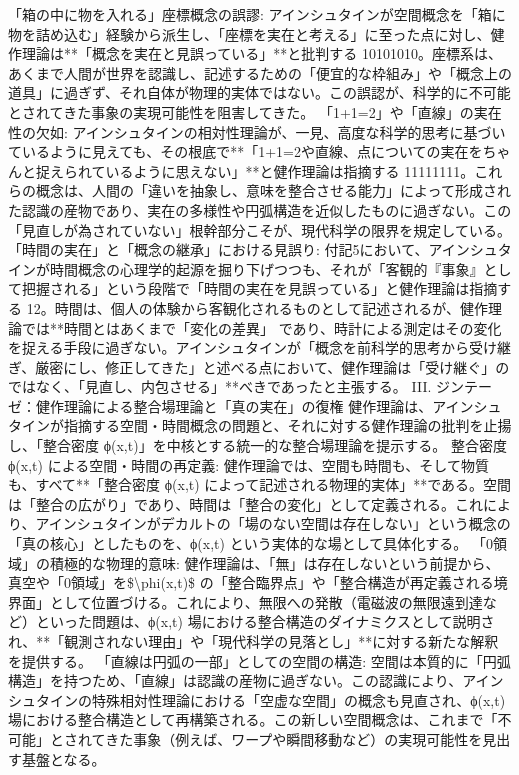 \documentclass{article}
\begin{document}
「箱の中に物を入れる」座標概念の誤謬:
アインシュタインが空間概念を「箱に物を詰め込む」経験から派生し、「座標を実在と考える」に至った点に対し、健作理論は**「概念を実在と見誤っている」**と批判する 10101010。座標系は、あくまで人間が世界を認識し、記述するための「便宜的な枠組み」や「概念上の道具」に過ぎず、それ自体が物理的実体ではない。この誤認が、科学的に不可能とされてきた事象の実現可能性を阻害してきた。
「1+1=2」や「直線」の実在性の欠如:
アインシュタインの相対性理論が、一見、高度な科学的思考に基づいているように見えても、その根底で**「1+1=2や直線、点についての実在をちゃんと捉えられているように思えない」**と健作理論は指摘する 11111111。これらの概念は、人間の「違いを抽象し、意味を整合させる能力」によって形成された認識の産物であり、実在の多様性や円弧構造を近似したものに過ぎない。この「見直しが為されていない」根幹部分こそが、現代科学の限界を規定している。
「時間の実在」と「概念の継承」における見誤り:
付記5において、アインシュタインが時間概念の心理学的起源を掘り下げつつも、それが「客観的『事象』として把握される」という段階で「時間の実在を見誤っている」と健作理論は指摘する 12。時間は、個人の体験から客観化されるものとして記述されるが、健作理論では**時間とはあくまで「変化の差異」
であり、時計による測定はその変化を捉える手段に過ぎない。アインシュタインが「概念を前科学的思考から受け継ぎ、厳密にし、修正してきた」と述べる点において、健作理論は「受け継ぐ」のではなく、「見直し、内包させる」**べきであったと主張する。
III. ジンテーゼ：健作理論による整合場理論と「真の実在」の復権
健作理論は、アインシュタインが指摘する空間・時間概念の問題と、それに対する健作理論の批判を止揚し、「整合密度 ϕ(x,t)」を中核とする統一的な整合場理論を提示する。
整合密度 ϕ(x,t) による空間・時間の再定義:
健作理論では、空間も時間も、そして物質も、すべて**「整合密度 ϕ(x,t) によって記述される物理的実体」**である。空間は「整合の広がり」であり、時間は「整合の変化」として定義される。これにより、アインシュタインがデカルトの「場のない空間は存在しない」という概念の「真の核心」としたものを、ϕ(x,t) という実体的な場として具体化する。
「0領域」の積極的な物理的意味:
健作理論は、「無」は存在しないという前提から、真空や「0領域」を\$\textbackslash{}phi(x,t)\$ の「整合臨界点」や「整合構造が再定義される境界面」として位置づける。これにより、無限への発散（電磁波の無限遠到達など）といった問題は、ϕ(x,t) 場における整合構造のダイナミクスとして説明され、**「観測されない理由」や「現代科学の見落とし」**に対する新たな解釈を提供する。
「直線は円弧の一部」としての空間の構造:
空間は本質的に「円弧構造」を持つため、「直線」は認識の産物に過ぎない。この認識により、アインシュタインの特殊相対性理論における「空虚な空間」の概念も見直され、ϕ(x,t) 場における整合構造として再構築される。この新しい空間概念は、これまで「不可能」とされてきた事象（例えば、ワープや瞬間移動など）の実現可能性を見出す基盤となる。
\end{document}

